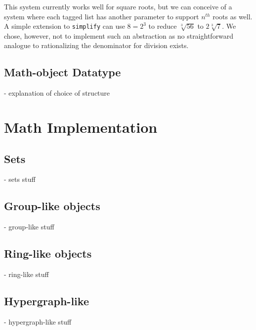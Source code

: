 \documentclass{article}
\begin{document}
                
                This system currently works well for square roots, but we can conceive of a system where each tagged list has another parameter to support $n^{th}$ roots as well. A simple extension to \texttt{simplify} can use $8 = 2^3$ to reduce $\sqrt[3]{56}$ to $2\sqrt[3]{7}$. We chose, however, not to implement such an abstraction as no straightforward analogue to rationalizing the denominator for division exists.
                                          
        \subsection{Math-object Datatype}
            
            - explanation of choice of structure
    
    
    \section{Math Implementation}
        
        \subsection{Sets}
            
            - sets stuff
        
        
        \subsection{Group-like objects}
            
            - group-like stuff
        
        
        \subsection{Ring-like objects}
            
            - ring-like stuff
        
        
        \subsection{Hypergraph-like}
            
            - hypergraph-like stuff
    
    
\end{document}
